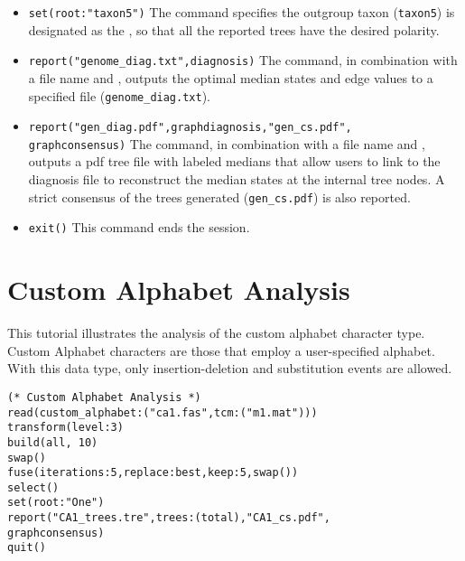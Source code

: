 \begin{itemize}
\item \texttt{set(root:"taxon5")} The  command specifies the outgroup taxon (\texttt{taxon5}) 
is designated as the , so that all the reported trees have the desired polarity.
\item \texttt{report("genome\_diag.txt",diagnosis)}  The  command, in combination with a file name and
 , outputs the optimal median states and edge values to a specified file (\texttt{genome\_diag.txt}). 
\item \texttt{report("gen\_diag.pdf",graphdiagnosis,"gen\_cs.pdf", \\ graphconsensus)}  The  command, 
in combination with a file name and , outputs a pdf tree file with labeled medians that allow 
users to link to the diagnosis file to reconstruct the median states at the internal tree nodes. A strict consensus
of the trees generated (\texttt{gen\_cs.pdf}) is also reported. 
\item \texttt{exit()} This command ends the \poy session.
\end{itemize}


\section{Custom Alphabet Analysis}{\label{tutorial12}}

This tutorial illustrates the analysis of the custom alphabet character type.  Custom Alphabet characters are 
those that employ a user-specified alphabet. With this data type, only insertion-deletion and substitution events are allowed.

\begin{verbatim}
(* Custom Alphabet Analysis *)
read(custom_alphabet:("ca1.fas",tcm:("m1.mat")))
transform(level:3)
build(all, 10)
swap()
fuse(iterations:5,replace:best,keep:5,swap())
select()
set(root:"One")
report("CA1_trees.tre",trees:(total),"CA1_cs.pdf",
graphconsensus)
quit()
\end{verbatim}

